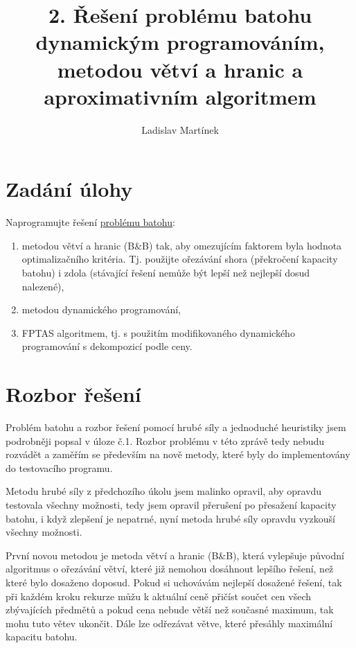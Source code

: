\documentclass[11pt]{article}
\begin{document}

\title{2. Řešení problému batohu dynamickým programováním, metodou větví a hranic a aproximativním algoritmem}
\author{Ladislav Martínek}
\date{}
\maketitle
 
\section{Zadání úlohy} 



Naprogramujte řešení \href{http://www.csc.kth.se/~viggo/wwwcompendium/node211.html#7374}{problému batohu}:
\begin{enumerate}
\item metodou větví a hranic (B\&B) tak, aby omezujícím faktorem byla hodnota optimalizačního kritéria. Tj. použijte ořezávání shora (překročení kapacity batohu) i zdola (stávající řešení nemůže být lepší než nejlepší dosud nalezené),
\item metodou dynamického programování,
\item FPTAS algoritmem, tj. s použitím modifikovaného dynamického programování s dekompozicí podle ceny.
\end{enumerate}

\section{Rozbor řešení}\label{kap:1}

Problém batohu a rozbor řešení pomocí hrubé síly a jednoduché heuristiky jsem podrobněji popsal v úloze č.1. Rozbor problému v této zprávě tedy nebudu rozvádět a zaměřím se především na nově metody, které byly do implementovány do testovacího programu.

Metodu hrubé síly z předchozího úkolu jsem malinko opravil, aby opravdu testovala všechny možnosti, tedy jsem opravil přerušení po přesažení kapacity batohu, i když zlepšení je nepatrné, nyní metoda hrubé síly opravdu vyzkouší všechny možnosti.

První novou metodou je metoda větví a hranic (B\&B), která vylepšuje původní algoritmus o ořezávání větví, které již nemohou dosáhnout lepšího řešení, než které bylo dosaženo doposud. Pokud si uchovávám nejlepší dosažené řešení, tak při každém kroku rekurze můžu k aktuální ceně přičíst součet cen všech zbývajících předmětů a pokud cena nebude větší než současné maximum, tak mohu tuto větev ukončit. Dále lze odřezávat větve, které přesáhly maximální kapacitu batohu.
\end{document}

